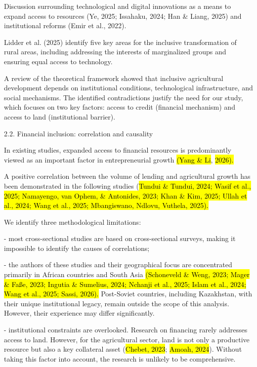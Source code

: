 \documentclass[
]{article}
\begin{document}
Discussion surrounding technological and digital innovations as a means
to expand access to resources (Ye, 2025; Issahaku, 2024; Han \& Liang,
2025) and institutional reforms (Emir et al., 2022).

Lidder et al. (2025) identify five key areas for the inclusive
transformation of rural areas, including addressing the interests of
marginalized groups and ensuring equal access to technology.

A review of the theoretical framework showed that inclusive agricultural
development depends on institutional conditions, technological
infrastructure, and social mechanisms. The identified contradictions
justify the need for our study, which focuses on two key factors: access
to credit (financial mechanism) and access to land (institutional
barrier).

2.2. Financial inclusion: correlation and causality

In existing studies, expanded access to financial resources is
predominantly viewed as an important factor in entrepreneurial growth
\hl{(Yang \& Li}, \hl{2026).}

A positive correlation between the volume of lending and agricultural
growth has been demonstrated in the following studies (\hl{Tundui \&
Tundui, 2024; Wasif et al., 2025; Namayengo, van Ophem, \& Antonides,
2023; Khan \& Kim, 2025; Ullah et al., 2024; Wang et al., 2025;
Mbangiswano, Ndlovu, Vuthela, 2025).}

We identify three methodological limitations:

- most cross-sectional studies are based on cross-sectional surveys,
making it impossible to identify the causes of correlations;

- the authors of these studies and their geographical focus are
concentrated primarily in African countries and South Asia
\hl{(Schoneveld \& Weng, 2023; Mager \& Faße, 2023; Ingutia \& Sumelius,
2024; Nchanji et al., 2025; Islam et al., 2024; Wang et al., 2025;
Sassi, 2026).} Post-Soviet countries, including Kazakhstan, with their
unique institutional legacy, remain outside the scope of this analysis.
However, their experience may differ significantly.

- institutional constraints are overlooked. Research on financing rarely
addresses access to land. However, for the agricultural sector, land is
not only a productive resource but also a key collateral asset
(\hl{Chebet, 2023}; \hl{Amoah, 2024}). Without taking this factor into
account, the research is unlikely to be comprehensive.
\end{document}
